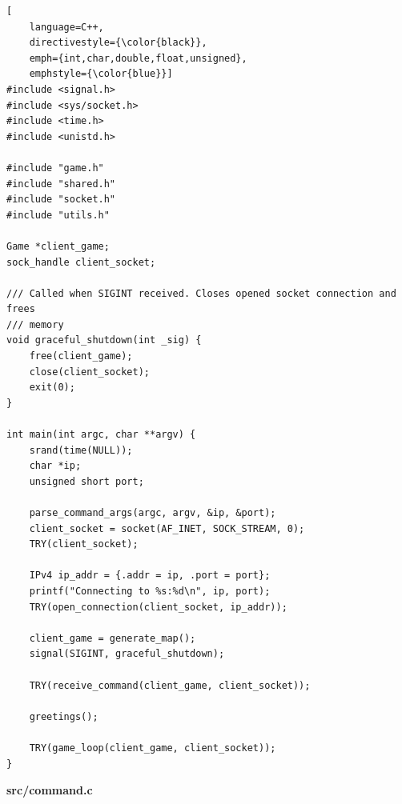 \begin{lstlisting}[
    language=C++,
    directivestyle={\color{black}}, 
    emph={int,char,double,float,unsigned}, 
    emphstyle={\color{blue}}]
#include <signal.h>
#include <sys/socket.h>
#include <time.h>
#include <unistd.h>

#include "game.h"
#include "shared.h"
#include "socket.h"
#include "utils.h"

Game *client_game;
sock_handle client_socket;

/// Called when SIGINT received. Closes opened socket connection and frees
/// memory
void graceful_shutdown(int _sig) {
    free(client_game);
    close(client_socket);
    exit(0);
}

int main(int argc, char **argv) {
    srand(time(NULL));
    char *ip;
    unsigned short port;

    parse_command_args(argc, argv, &ip, &port);
    client_socket = socket(AF_INET, SOCK_STREAM, 0);
    TRY(client_socket);

    IPv4 ip_addr = {.addr = ip, .port = port};
    printf("Connecting to %s:%d\n", ip, port);
    TRY(open_connection(client_socket, ip_addr));

    client_game = generate_map();
    signal(SIGINT, graceful_shutdown);

    TRY(receive_command(client_game, client_socket));

    greetings();

    TRY(game_loop(client_game, client_socket));
}
\end{lstlisting}

\textbf{src/command.c}

